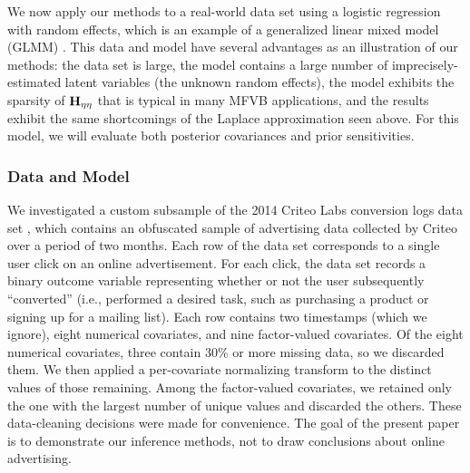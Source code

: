\documentclass{article}\usepackage[]{graphicx}\usepackage[]{color}
\theoremstyle{definition}
\theoremstyle{plain}
\theoremstyle{plain}
\theoremstyle{plain}
\theoremstyle{definition}
\theoremstyle{plain}
\theoremstyle{plain}
\begin{document}
\newcommand{\glmmDimension}{5}
\newcommand{\glmmNumGroups}{5000}
\newcommand{\glmmNumObs}{61895}
\newcommand{\glmmHessDim}{10014}
\newcommand{\glmmInverseTime}{173}
\newcommand{\glmmHessianTime}{323}
\newcommand{\glmmVBTime}{57}
\newcommand{\glmmMCMCTime}{21066}
\newcommand{\glmmMCMCTimeMinutes}{351}
\newcommand{\glmmCGRowTime}{9.4}
\newcommand{\glmmCGRowIters}{81}
\newcommand{\glmmCGBetaTime}{46.9}
\newcommand{\glmmMAPTime}{12}
\newcommand{\glmmGLMERTime}{104}
\newcommand{\glmmVBRefitTime}{27.2}
\newcommand{\glmmSpeedup}{370}
\newcommand{\glmmNumMCMCDraws}{5000}
\newcommand{\glmmNumGHPoints}{4}
\newcommand{\glmmBetaInfoDiag}{0.100}
\newcommand{\glmmBetaLoc}{0.000}
\newcommand{\glmmMuLoc}{0.000}
\newcommand{\glmmMuInfo}{0.010}
\newcommand{\glmmTauAlpha}{3.000}
\newcommand{\glmmTauBeta}{3.000}


We now apply our methods to a real-world data set using a logistic
regression with random effects, which is an example of a generalized
linear mixed model (GLMM) \citep[Chapter 13]{agresti:2011:categorical}.
This data and model have several advantages as an illustration of
our methods: the data set is large, the model contains a large number
of imprecisely-estimated latent variables (the unknown random effects),
the model exhibits the sparsity of $\mathbf{H}_{\eta\eta}$ that is typical in many
MFVB applications, and the results exhibit the same shortcomings of
the Laplace approximation seen above. For this model, we will evaluate
both posterior covariances and prior sensitivities.

\subsubsection{Data and Model}

We investigated a custom subsample of the 2014 Criteo Labs conversion
logs data set \citep{criteo:2014:dataset}, which contains an obfuscated
sample of advertising data collected by Criteo over a period of two
months. Each row of the data set corresponds to a single user click
on an online advertisement. For each click, the data set records a
binary outcome variable representing whether or not the user subsequently
``converted'' (i.e., performed a desired task, such as purchasing
a product or signing up for a mailing list). Each row contains two timestamps
(which we ignore), eight numerical covariates, and nine factor-valued
covariates. Of the eight numerical covariates, three contain 30\%
or more missing data, so we discarded them. We then applied a per-covariate
normalizing transform to the distinct values of those remaining. Among
the factor-valued covariates, we retained only the one with the largest
number of unique values and discarded the others. These data-cleaning
decisions were made for convenience. The goal of the present paper
is to demonstrate our inference methods, not to draw conclusions about
online advertising.
\end{document}
